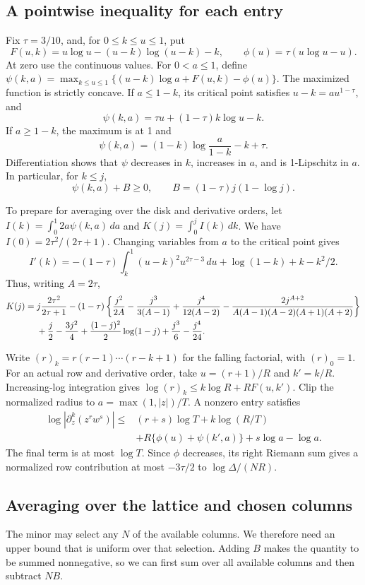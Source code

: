 \documentclass[11pt]{article}
\begin{document}
\subsection{A pointwise inequality for each entry}
Fix \(\tau=3/10\), and, for \(0\le k\le u\le1\), put
\[
 F(u,k)=u\log u-(u-k)\log(u-k)-k,\qquad
 \phi(u)=\tau(u\log u-u).
\]
At zero use the continuous values. For \(0<a\le1\), define
\(\psi(k,a)=\max_{k\le u\le1}\{(u-k)\log a+F(u,k)-\phi(u)\}\).
The maximized function is strictly concave. If \(a\le1-k\), its
critical point satisfies \(u-k=au^{1-\tau}\), and
\[
 \psi(k,a)=\tau u+(1-\tau)k\log u-k.
\]
If \(a\ge1-k\), the maximum is at 1 and
\[
 \psi(k,a)=(1-k)\log\frac a{1-k}-k+\tau.
\]
Differentiation shows that \(\psi\) decreases in \(k\), increases in
\(a\), and is 1-Lipschitz in \(a\). In particular, for \(k\le j\),
\[
 \psi(k,a)+B\ge0,\qquad B=(1-\tau)j(1-\log j).
\]

To prepare for averaging over the disk and derivative orders, let
\(I(k)=\int_0^1 2a\psi(k,a)\,da\) and
\(K(j)=\int_0^j I(k)\,dk\). We have \(I(0)=2\tau^2/(2\tau+1)\).
Changing variables from \(a\) to the critical point gives
\[
 I'(k)=-(1-\tau)\int_k^1(u-k)^2u^{2\tau-3}\,du
               +\log(1-k)+k-k^2/2.
\]
Thus, writing \(A=2\tau\),
\begin{align}\label{Kformula}
 K(j)={}&j\frac{2\tau^2}{2\tau+1}
 -(1-\tau)\left\{\frac{j^2}{2A}-\frac{j^3}{3(A-1)}
 +\frac{j^4}{12(A-2)}
 -\frac{2j^{A+2}}{A(A-1)(A-2)(A+1)(A+2)}\right\}\\
 &+\frac j2-\frac{3j^2}4+\frac{(1-j)^2}2\log(1-j)
        +\frac{j^3}6-\frac{j^4}{24}.
 \notag
\end{align}

Write \((r)_k=r(r-1)\cdots(r-k+1)\) for the falling factorial,
with \((r)_0=1\). For an actual row and derivative order, take \(u=(r+1)/R\) and
\(k'=k/R\). Increasing-log integration gives
\(\log(r)_k\le k\log R+RF(u,k')\).
Clip the normalized radius to \(a=\max(1,|z|)/T\). A nonzero entry
satisfies
\begin{align*}
 \log|\partial_z^k(z^rw^s)|\le{}&
 (r+s)\log T+k\log(R/T)\\
 &+R\{\phi(u)+\psi(k',a)\}+s\log a-\log a.
\end{align*}
The final term is at most \(\log T\). Since \(\phi\) decreases, its
right Riemann sum gives a normalized row contribution at most
\(-3\tau/2\) to \(\log\Delta/(NR)\).

\subsection{Averaging over the lattice and chosen columns}\label{arch-averaging}
The minor may select any \(N\) of the available columns. We therefore
need an upper bound that is uniform over that selection. Adding \(B\)
makes the quantity to be summed nonnegative, so we can first sum over
all available columns and then subtract \(NB\).
\end{document}
